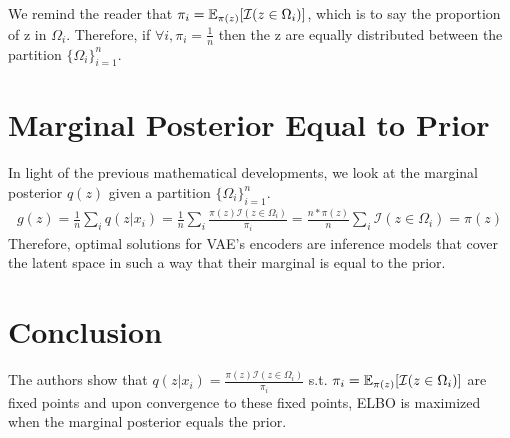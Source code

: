 We remind the reader that $\pi_{i} = \operatorname{\mathbb{E}}_{\pi(z)}[\mathcal{I}(z\in\Omega_{i})]$, which is to say the proportion of z in $\Omega_i$. Therefore, if $\forall i, \pi_i = \frac{1}{n}$ then the z are equally distributed between the partition $\lbrace{{\Omega_i}\rbrace}_{i=1}^n$.

\section*{Marginal Posterior Equal to Prior}
In light of the previous mathematical developments, we look at the marginal posterior $q(z)$ given a partition $\lbrace{{\Omega_i}\rbrace}_{i=1}^n$.
\begin{gather*}
g(z) = \frac{1}{n}\sum_i q(z|x_i) = \frac{1}{n}\sum_i \frac{\pi(z)\mathcal{I}(z\in\Omega_i)}{\pi_i} = \frac{n * \pi(z)}{n} \sum_i \mathcal{I}(z\in\Omega_i)= \pi(z)
\end{gather*}
Therefore, optimal solutions for VAE's encoders are inference models that cover the latent space in such a way that their marginal is equal to the prior.

\section*{Conclusion}
The authors show that $q(z|x_{i}) = \frac{\pi(z)\mathcal{I}({z\in\Omega_{i}})}{\pi_{i}}$ s.t. $\pi_{i} = \operatorname{\mathbb{E}}_{\pi(z)}[\mathcal{I}(z\in\Omega_{i})]$ are fixed points and upon convergence to these fixed points, ELBO is maximized when the marginal posterior equals the prior.





